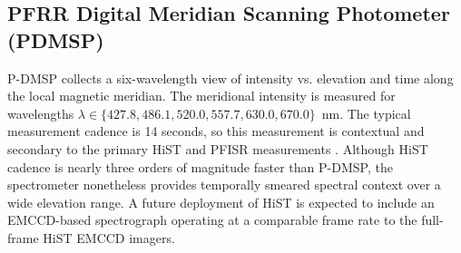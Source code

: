 \FloatBarrier
\subsection{PFRR Digital Meridian Scanning Photometer (PDMSP)}\label{sec:pdmsp}
P-DMSP collects a six-wavelength view of intensity vs. elevation and time along the local magnetic meridian.
The meridional intensity is measured for wavelengths $\lambda \in \lbrace 427.8, 486.1, 520.0, 557.7, 630.0, 670.0 \rbrace$~nm.
The typical measurement cadence is 14 seconds, so this measurement is contextual and secondary to the primary HiST and PFISR measurements \citep{meridianreader}.
Although HiST cadence is nearly three orders of magnitude faster than P-DMSP, the spectrometer nonetheless provides temporally smeared spectral context over a wide elevation range.
A future deployment of HiST is expected to include an EMCCD-based spectrograph operating at a comparable frame rate to the full-frame HiST EMCCD imagers.